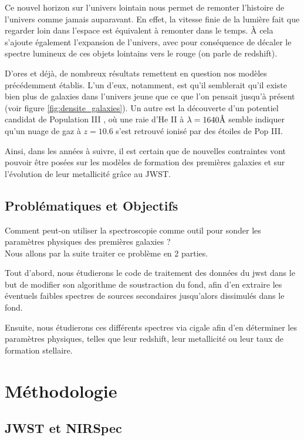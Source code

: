 \documentclass[11pt, a4paper]{article}
\begin{document}
Ce nouvel horizon sur l'univers lointain nous permet de remonter l'histoire de l'univers comme jamais auparavant. En effet, la vitesse finie de la lumière fait que regarder loin dans l'espace est équivalent à remonter dans le temps. À cela s'ajoute également l'expansion de l'univers, avec pour conséquence de décaler le spectre lumineux de ces objets lointains vers le rouge (on parle de redshift).

D'ores et déjà, de nombreux résultats remettent en question nos modèles précédemment établis. L'un d'eux, notamment, est qu'il semblerait qu'il existe bien plus de galaxies dans l'univers jeune que ce que l'on pensait jusqu'à présent \cite{2023arXiv231104279F} (voir figure \ref{fig:densite_galaxies}). Un autre est la découverte d'un potentiel candidat de Population III \cite{2023arXiv230600953M}, où une raie d'He II à $\lambda = 1640 \text{\r{A}}$ semble indiquer qu'un nuage de gaz à $z = 10.6$ s'est retrouvé ionisé par des étoiles de Pop III. 

Ainsi, dans les années à suivre, il est certain que de nouvelles contraintes vont pouvoir être posées sur les modèles de formation des premières galaxies et sur l'évolution de leur metallicité grâce au JWST.

\subsection{Problématiques et Objectifs}

Comment peut-on utiliser la spectroscopie comme outil pour sonder les paramètres physiques des premières galaxies ?\\

Nous allons par la suite traiter ce problème en 2 parties.

Tout d'abord, nous étudierons le code de traitement des données du \gls{jwst} dans le but de modifier son algorithme de soustraction du fond, afin d'en extraire les éventuels faibles spectres de sources secondaires jusqu'alors dissimulés dans le fond.

Ensuite, nous étudierons ces différents spectres via \gls{cigale} afin d'en déterminer les paramètres physiques, telles que leur redshift, leur metallicité ou leur taux de formation stellaire.

\section{Méthodologie}

\subsection{JWST et NIRSpec}
\end{document}
